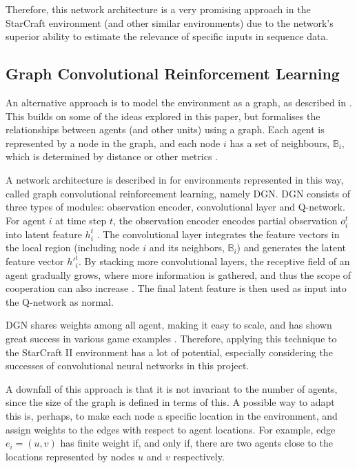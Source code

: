 Therefore, this network architecture is a very promising approach in the StarCraft environment (and other similar environments) due to the network's superior ability to estimate the relevance of specific inputs in sequence data.


\subsection{Graph Convolutional Reinforcement Learning}

An alternative approach is to model the environment as a graph, as described in \cite{graph}. This builds on some of the ideas explored in this paper, but formalises the relationships between agents (and other units) using a graph. Each agent is represented by a node in the graph, and each node $i$ has a set of neighbours, $\mathbb{B}_i$, which is determined by distance or other metrics \cite{graph}.

A network architecture is described in \cite{graph} for environments represented in this way, called graph  convolutional reinforcement learning, namely DGN. DGN consists of three types of modules:  observation encoder, convolutional layer and Q-network. For agent $i$ at time step $t$, the observation encoder encodes partial observation $o_i^t$ into latent feature $h_i^t$ \cite{graph}. The convolutional layer integrates the feature vectors in the local region (including node $i$ and its neighbors, $\mathbb{B}_i$) and generates the latent feature vector ${h'}^t_i$. By stacking more convolutional layers, the receptive field of an agent gradually grows, where more information is gathered, and thus the scope of cooperation can also increase \cite{graph}. The final latent feature is then used as input into the Q-network as normal.

DGN shares weights among all agent, making it easy to scale, and has shown great success in various game examples \cite{graph}. Therefore, applying this technique to the StarCraft II environment has a lot of potential, especially considering the successes of convolutional neural networks in this project. 

A downfall of this approach is that it is not invariant to the number of agents, since the size of the graph is defined in terms of this. A possible way to adapt this is, perhaps, to make each node a specific location in the environment, and assign weights to the edges with respect to agent locations. For example, edge $e_i = (u,v)$ has finite weight if, and only if, there are two agents close to the locations represented by nodes $u$ and $v$ respectively.


